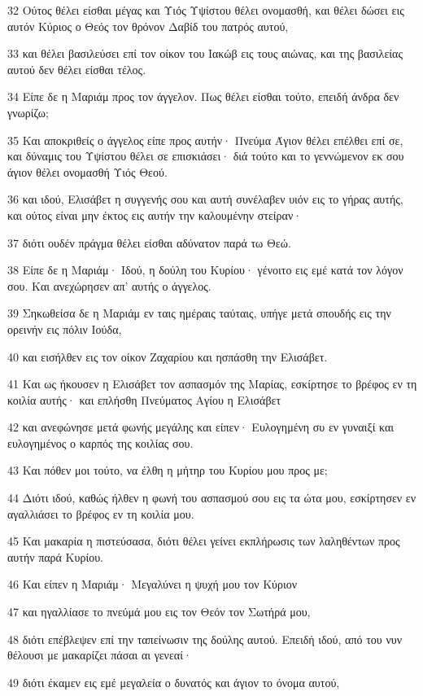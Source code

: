 \par 32 Ούτος θέλει είσθαι μέγας και Υιός Υψίστου θέλει ονομασθή, και θέλει δώσει εις αυτόν Κύριος ο Θεός τον θρόνον Δαβίδ του πατρός αυτού,
\par 33 και θέλει βασιλεύσει επί τον οίκον του Ιακώβ εις τους αιώνας, και της βασιλείας αυτού δεν θέλει είσθαι τέλος.
\par 34 Είπε δε η Μαριάμ προς τον άγγελον. Πως θέλει είσθαι τούτο, επειδή άνδρα δεν γνωρίζω;
\par 35 Και αποκριθείς ο άγγελος είπε προς αυτήν· Πνεύμα Άγιον θέλει επέλθει επί σε, και δύναμις του Υψίστου θέλει σε επισκιάσει· διά τούτο και το γεννώμενον εκ σου άγιον θέλει ονομασθή Υιός Θεού.
\par 36 και ιδού, Ελισάβετ η συγγενής σου και αυτή συνέλαβεν υιόν εις το γήρας αυτής, και ούτος είναι μην έκτος εις αυτήν την καλουμένην στείραν·
\par 37 διότι ουδέν πράγμα θέλει είσθαι αδύνατον παρά τω Θεώ.
\par 38 Είπε δε η Μαριάμ· Ιδού, η δούλη του Κυρίου· γένοιτο εις εμέ κατά τον λόγον σου. Και ανεχώρησεν απ' αυτής ο άγγελος.
\par 39 Σηκωθείσα δε η Μαριάμ εν ταις ημέραις ταύταις, υπήγε μετά σπουδής εις την ορεινήν εις πόλιν Ιούδα,
\par 40 και εισήλθεν εις τον οίκον Ζαχαρίου και ησπάσθη την Ελισάβετ.
\par 41 Και ως ήκουσεν η Ελισάβετ τον ασπασμόν της Μαρίας, εσκίρτησε το βρέφος εν τη κοιλία αυτής· και επλήσθη Πνεύματος Αγίου η Ελισάβετ
\par 42 και ανεφώνησε μετά φωνής μεγάλης και είπεν· Ευλογημένη συ εν γυναιξί και ευλογημένος ο καρπός της κοιλίας σου.
\par 43 Και πόθεν μοι τούτο, να έλθη η μήτηρ του Κυρίου μου προς με;
\par 44 Διότι ιδού, καθώς ήλθεν η φωνή του ασπασμού σου εις τα ώτα μου, εσκίρτησεν εν αγαλλιάσει το βρέφος εν τη κοιλία μου.
\par 45 Και μακαρία η πιστεύσασα, διότι θέλει γείνει εκπλήρωσις των λαληθέντων προς αυτήν παρά Κυρίου.
\par 46 Και είπεν η Μαριάμ· Μεγαλύνει η ψυχή μου τον Κύριον
\par 47 και ηγαλλίασε το πνεύμά μου εις τον Θεόν τον Σωτήρά μου,
\par 48 διότι επέβλεψεν επί την ταπείνωσιν της δούλης αυτού. Επειδή ιδού, από του νυν θέλουσι με μακαρίζει πάσαι αι γενεαί·
\par 49 διότι έκαμεν εις εμέ μεγαλεία ο δυνατός και άγιον το όνομα αυτού,
